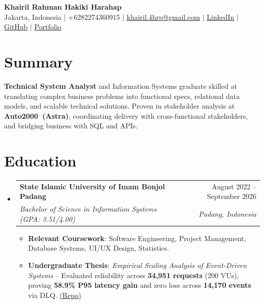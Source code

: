 \documentclass[letterpaper,11pt]{article}
\makeatletter
\newcommand{\resumeItem}[1]{\item\small{#1}}
\newcommand{\resumeSubheading}[4]{
  \item
    \begin{tabular*}{\textwidth}[t]{l@{\extracolsep{\fill}}r}
      \textbf{#1} & #2 \\
      \textit{\small#3} & \textit{\small #4} \\
    \end{tabular*}\vspace{-1.2pt}
}
\newcommand{\resumeSubHeadingListStart}{\begin{itemize}[leftmargin=0in, label={}, itemsep=1.2pt, parsep=0pt, topsep=0.5pt]}
\newcommand{\resumeSubHeadingListEnd}{\end{itemize}\vspace{-1.5pt}}
\newcommand{\resumeItemListStart}{\begin{itemize}[leftmargin=15pt, label=\tiny$\bullet$, itemsep=1.1pt, parsep=0pt, topsep=0.5pt]}
\newcommand{\resumeItemListEnd}{\end{itemize}}
\makeatother
\begin{document}
\begin{center}\vspace*{-3pt}
    {\LARGE \bfseries Khairil Rahman Hakiki Harahap} \\[2pt]
    \footnotesize Jakarta, Indonesia $|$ +6282274360915 $|$ \href{mailto:khairil.4hrp@gmail.com}{khairil.4hrp@gmail.com} $|$ \href{https://linkedin.com/in/khairilrahman}{LinkedIn} $|$ \href{https://github.com/kyyril}{GitHub} $|$ \href{https://kiril.is-a.dev}{Portfolio}
\end{center}\vspace{-5pt}

\section{Summary}
  \small{\textbf{Technical System Analyst} and Information Systems graduate skilled at translating complex business problems into functional specs, relational data models, and scalable technical solutions. Proven in stakeholder analysis at \mbox{\textbf{Auto2000 (Astra)}}, coordinating delivery with cross-functional stakeholders, and bridging business with SQL and APIs.}

\section{Education}
  \resumeSubHeadingListStart
    \resumeSubheading
      {State Islamic University of Imam Bonjol Padang}{August 2022 -- September 2026}
      {Bachelor of Science in Information Systems (GPA: 3.51/4.00)}{Padang, Indonesia}
      \resumeItemListStart
        \resumeItem{\textbf{Relevant Coursework}: Software Engineering, Project Management, Database Systems, UI/UX Design, Statistics.}
        \resumeItem{\textbf{Undergraduate Thesis}: \emph{Empirical Scaling Analysis of Event-Driven Systems} -- Evaluated reliability across \textbf{34,951 requests} (200 VUs), proving \textbf{58.9\% P95 latency gain} and zero loss across \textbf{14,170 events} via DLQ. \href{https://repository.uinib.ac.id/34986/}{\underline{(Repo)}}}
      \resumeItemListEnd
  \resumeSubHeadingListEnd

\end{document}
